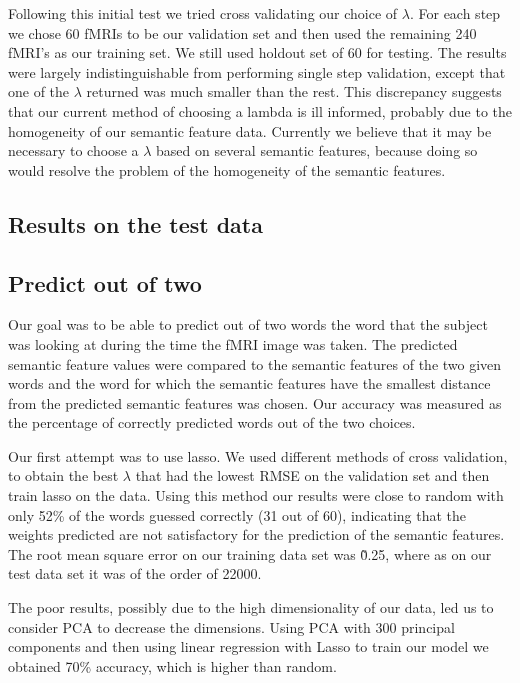 \documentclass{article} %
\begin{document}
Following this initial test we tried cross validating our choice of $\lambda$. For each step we chose 60 fMRIs to be our validation set and then used the remaining 240 fMRI's as our training set. We still used holdout set of 60 for testing. The results were largely indistinguishable from performing single step validation, except that one of the $\lambda$ returned was much smaller than the rest. This discrepancy suggests that our current method of choosing a lambda is ill informed, probably due to the homogeneity of our semantic feature data. Currently we believe that it may be necessary to choose a $\lambda$ based on several semantic features, because doing so would resolve the problem of the homogeneity of the semantic features.





\subsection{Results on the test data}


\subsection{Predict out of two}
Our goal was to be able to predict out of two words the word that the subject was looking at during the time the fMRI image was taken. The predicted semantic feature values were compared to the semantic features of the two given words and the word for which the semantic features have the smallest distance from the predicted semantic features was chosen. Our accuracy was measured as the percentage of correctly predicted words out of the two choices. 

Our first attempt was to use lasso. We used different methods of cross validation, to obtain the best $\lambda$  that had the lowest RMSE on the validation set and then train lasso on the data. Using this method our results were close to random with only 52\% of the words guessed correctly (31 out of 60), indicating that the weights predicted are not satisfactory for the prediction of the semantic features. The root mean square error on our training data set was \~0.25, where as on our test data set it was of the order of 22000. 

The poor results, possibly due to the high dimensionality of our data, led us to consider PCA to decrease the dimensions. Using PCA with 300 principal components and then using linear regression with Lasso to train our model we obtained 70\% accuracy, which is higher than random. 
\end{document}
